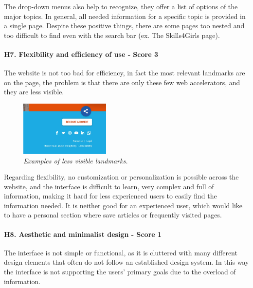 \newline The drop-down menus also help to recognize, they offer a list of options of the major topics.
\newline In general, all needed information for a specific topic is provided in a single page.
\newline Despite these positive things, there are some pages too nested and too difficult to find even with the search bar (ex. The Skills4Girls page).
\newline
\newline \paragraph{H7. Flexibility and efficiency of use - Score 3}	The website is not too bad for efficiency, in fact the most relevant landmarks are on the page, the problem is that there are only these few web accelerators, and they are less visible.
\begin{figure}[!h]
	\begin{center}
		\includegraphics[width=0.4\textwidth]{FinalScores13.jpg}
		\captionsetup{font=small}
		\caption{\textit{Examples of less visible landmarks.}}
	\end{center}
\end{figure}
\newline Regarding flexibility, no customization or personalization is possible across the website, and the interface is difficult to learn, very complex and full of information, making it hard for less experienced users to easily find the information needed. It is neither good for an experienced user, which would like to have a personal section where save articles or frequently visited pages.
\newline
\newline \paragraph{H8. Aesthetic and minimalist design - Score 1}	The interface is not simple or functional, as it is cluttered with many different design elements that often do not follow an established design system. In this way the interface is not supporting the users’ primary goals due to the overload of information.
